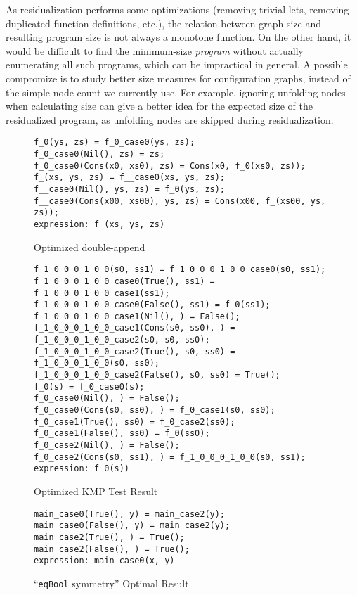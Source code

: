 \documentclass[submission,copyright,creativecommons]{eptcs}
\begin{document}
\begin{itemize}
    As residualization performs some optimizations (removing trivial lets, removing duplicated
    function definitions, etc.), the relation between graph size and resulting program size
    is not always a monotone function.
    On the other hand, it would be difficult to find the minimum-size \emph{program}
    without actually enumerating all such programs, which can be impractical in general.
    A possible compromize is to study better size measures for configuration graphs, instead
    of the simple node count we currently use.
    For example, ignoring unfolding nodes when calculating size can give a better idea for the expected size
    of the residualized program, as unfolding nodes are skipped during residualization.
    
\end{itemize}

\begin{figure}
\begin{lstlisting}
f_0(ys, zs) = f_0_case0(ys, zs);
f_0_case0(Nil(), zs) = zs;
f_0_case0(Cons(x0, xs0), zs) = Cons(x0, f_0(xs0, zs));
f_(xs, ys, zs) = f__case0(xs, ys, zs);
f__case0(Nil(), ys, zs) = f_0(ys, zs);
f__case0(Cons(x00, xs00), ys, zs) = Cons(x00, f_(xs00, ys, zs));
expression: f_(xs, ys, zs)
\end{lstlisting}
\caption{Optimized double-append}
\label{fig:DoubleAppResult}
\end{figure}

\begin{figure}
\begin{lstlisting}
f_1_0_0_0_1_0_0(s0, ss1) = f_1_0_0_0_1_0_0_case0(s0, ss1);
f_1_0_0_0_1_0_0_case0(True(), ss1) = f_1_0_0_0_1_0_0_case1(ss1);
f_1_0_0_0_1_0_0_case0(False(), ss1) = f_0(ss1);
f_1_0_0_0_1_0_0_case1(Nil(), ) = False();
f_1_0_0_0_1_0_0_case1(Cons(s0, ss0), ) = f_1_0_0_0_1_0_0_case2(s0, s0, ss0);
f_1_0_0_0_1_0_0_case2(True(), s0, ss0) = f_1_0_0_0_1_0_0(s0, ss0);
f_1_0_0_0_1_0_0_case2(False(), s0, ss0) = True();
f_0(s) = f_0_case0(s);
f_0_case0(Nil(), ) = False();
f_0_case0(Cons(s0, ss0), ) = f_0_case1(s0, ss0);
f_0_case1(True(), ss0) = f_0_case2(ss0);
f_0_case1(False(), ss0) = f_0(ss0);
f_0_case2(Nil(), ) = False();
f_0_case2(Cons(s0, ss1), ) = f_1_0_0_0_1_0_0(s0, ss1);
expression: f_0(s))
\end{lstlisting}
\caption{Optimized KMP Test Result}
\label{fig:KMPResult}
\end{figure}

\begin{figure}
\begin{lstlisting}
main_case0(True(), y) = main_case2(y);
main_case0(False(), y) = main_case2(y);
main_case2(True(), ) = True();
main_case2(False(), ) = True();
expression: main_case0(x, y)
\end{lstlisting}
\caption{``\texttt{eqBool} symmetry'' Optimal Result}
\label{fig:BoolEqSymResult}
\end{figure}
\end{document}
